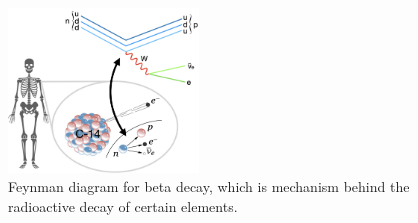 \begin{figure}[htb]
    \centering
    \includegraphics[width=0.45\textwidth]{fig/feynman/beta_decay.png}
    \caption{
        Feynman diagram for beta decay, which is mechanism behind the radioactive decay of certain elements. 
    }
    \label{fig:beta_decay}
\end{figure}

